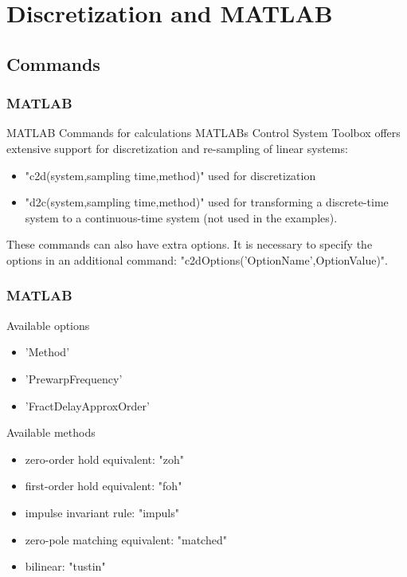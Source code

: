 \section{Discretization and MATLAB}
\subsection{Commands}
\begin{frame}
	\frametitle{MATLAB}
	\begin{block}{MATLAB Commands for calculations}
		MATLABs Control System Toolbox offers extensive support for discretization and re-sampling of linear systems:
	\begin{itemize}
		\item "c2d(system,sampling time,method)" used for discretization
		\item "d2c(system,sampling time,method)" used for transforming a discrete-time system to a continuous-time system (not used in the examples).
	\end{itemize}
	\vspace{1em}
		These commands can also have extra options. It is necessary to specify the options in an additional command:
		"c2dOptions('OptionName',OptionValue)".
	\end{block}
\end{frame}

\begin{frame}
	\frametitle{MATLAB}
	\begin{block}{Available options}
		\begin{itemize}
			\item 'Method'
			\item 'PrewarpFrequency'
			\item 'FractDelayApproxOrder'
		\end{itemize}
	\end{block}
	\begin{block}{Available methods}
		\begin{itemize}
			\item zero-order hold equivalent: "zoh"
			\item first-order hold equivalent: "foh"
			\item impulse invariant rule: "impuls"
			\item zero-pole matching equivalent: "matched"
			\item bilinear: "tustin"
		\end{itemize}
	\end{block}
\end{frame}

